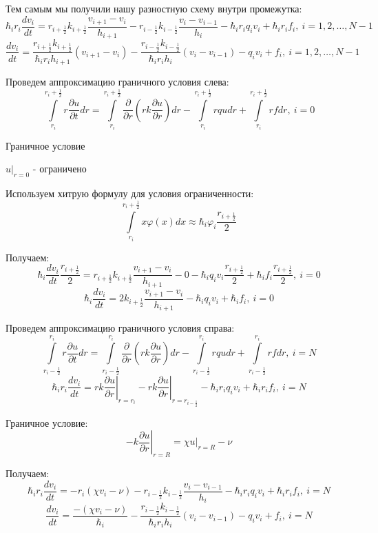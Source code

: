 Тем самым мы получили нашу разностную схему внутри промежутка:
\[
  \hbar_i r_i \frac{d v_i}{dt} = r_{i + \frac{1}{2}} k_{i + \frac{1}{2}} \frac{v_{i+1}-v_i}{h_{i + 1}} 
  - r_{i - \frac{1}{2}} k_{i - \frac{1}{2}} \frac{v_{i}-v_{i-1}}{h_{i}} -\hbar_i r_i q_i v_i + \hbar_i r_i f_i,\ i = 1, 2, \dots, N-1
\]
\[
  \frac{d v_i}{dt} = \frac{r_{i + \frac{1}{2}} k_{i + \frac{1}{2}}}{\hbar_i r_i h_{i + 1}} (v_{i+1}-v_i)
  - \frac{r_{i - \frac{1}{2}} k_{i - \frac{1}{2}}}{\hbar_i r_i h_{i}} (v_{i}-v_{i-1}) - q_i v_i + f_i,\ i = 1, 2, \dots, N-1
\]

Проведем аппроксимацию граничного условия слева:
\[
  \int\limits^{r_i+\frac{1}{2}}_{r_i} r \frac{\partial u}{\partial t} dr =
  \int\limits^{r_i+\frac{1}{2}}_{r_i} \frac{\partial}{\partial r} \left ( rk\frac{\partial u}{\partial r} \right ) dr
  - \int\limits^{r_i+\frac{1}{2}}_{r_i} rqu dr + \int\limits^{r_i+\frac{1}{2}}_{r_i} rf dr,\ i = 0
\]

Граничное условие

\centerline{\(\left. u\right\vert_{r = 0}\) - ограничено}
\medskip

Используем хитрую формулу для условия ограниченности:
\[
  \int\limits^{r_i+\frac{1}{2}}_{r_i} x \varphi(x)dx \approx \hbar_i \varphi_i \frac{r_{i+\frac{1}{2}}}{2}
\]

Получаем:
\[\hbar_i \frac{d v_i}{dt} \frac{r_{i+\frac{1}{2}}}{2} = r_{i + \frac{1}{2}} k_{i + \frac{1}{2}} \frac{v_{i+1}-v_i}{h_{i + 1}} - 0 - \hbar_i q_i v_i \frac{r_{i+\frac{1}{2}}}{2} + \hbar_i f_i \frac{r_{i+\frac{1}{2}}}{2},\ i = 0\]
\[\hbar_i \frac{d v_i}{dt} = 2 k_{i + \frac{1}{2}} \frac{v_{i+1}-v_i}{h_{i + 1}} - \hbar_i q_i v_i + \hbar_i f_i,\ i = 0\]

Проведем аппроксимацию граничного условия справа:
\[
  \int\limits^{r_i}_{r_i-\frac{1}{2}} r \frac{\partial u}{\partial t} dr =
  \int\limits^{r_i}_{r_i-\frac{1}{2}} \frac{\partial}{\partial r} \left ( rk\frac{\partial u}{\partial r} \right ) dr
  - \int\limits^{r_i}_{r_i-\frac{1}{2}} rqu dr + \int\limits^{r_i}_{r_i-\frac{1}{2}} rf dr,\ i = N
\]
\[
  \hbar_i r_i \frac{d v_i}{dt} = \left . rk \frac{\partial u}{\partial r} \right \vert_{r=r_i}
  - \left . rk \frac{\partial u}{\partial r} \right \vert_{r=r_{i-\frac{1}{2}}} -\hbar_i r_i q_i v_i + \hbar_i r_i f_i,\ i = N
\]

Граничное условие:
\[
  -k \left. \frac{\partial u}{\partial r}\right\vert_{r = R} = \chi\left.u\right\vert_{r = R} -\nu
\]

Получаем:
\[
  \hbar_i r_i \frac{d v_i}{dt} = -r_{i } (\chi v_i - \nu)
  - r_{i - \frac{1}{2}} k_{i - \frac{1}{2}} \frac{v_{i}-v_{i-1}}{h_{i}} -\hbar_i r_i q_i v_i + \hbar_i r_i f_i,\ i = N
\]
\[
  \frac{d v_i}{dt} = \frac{-(\chi v_i - \nu)}{\hbar_i}
  - \frac{r_{i - \frac{1}{2}} k_{i - \frac{1}{2}}}{\hbar_i r_i h_{i}} (v_{i}-v_{i-1}) - q_i v_i + f_i,\ i = N
\]

